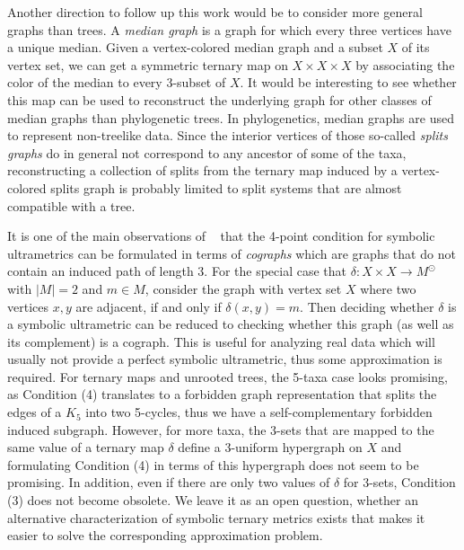 \documentclass{article}
\begin{document}
Another direction to follow up this work would be to consider more general graphs than  
trees. A {\em median graph} is a graph for which every three vertices have a unique median. 
Given a vertex-colored median graph and a subset $X$ of its vertex set, we can get 
a symmetric ternary map on $X \times X \times X$ by associating the color of the median 
to every 3-subset of $X$. It would be interesting to see whether this map can be used 
to reconstruct the underlying graph for other classes of median graphs than 
phylogenetic trees. In phylogenetics, median graphs are used to represent non-treelike 
data. Since the interior vertices of those so-called  {\em splits graphs} 
do in general not correspond to 
any ancestor of some of the taxa, reconstructing a collection of splits from the ternary 
map induced by a vertex-colored splits graph is probably limited to split systems 
that are almost compatible with a tree. 

It is one of the main observations of ~\cite{Hellmuth2013} that the 4-point condition 
for symbolic ultrametrics can be formulated in terms of {\em cographs} which 
are graphs that do 
not contain an induced path of length 3. For the special case that 
$\delta: X\times X\to M^{\odot}$ with $|M|=2$ and $m \in M$, consider the graph with 
vertex set $X$ where two vertices $x,y$ are adjacent, if and only if $\delta(x,y)=m$. 
Then deciding whether $\delta$ is a symbolic 
ultrametric can be reduced to checking whether this graph (as well as its complement) 
is a cograph. This is useful for analyzing real data which will usually not provide a perfect 
symbolic ultrametric, thus some approximation is required. For ternary maps and 
unrooted trees, the 5-taxa case looks promising, as Condition (4) translates to 
a forbidden graph representation that splits the edges of a $K_5$ into two 
5-cycles, thus we have a self-complementary forbidden induced subgraph. 
However, for more taxa, the 3-sets that are mapped to the same value of a ternary map 
$\delta$ define a 3-uniform hypergraph on $X$ and formulating Condition (4) in 
terms of this hypergraph does not seem to be promising. In addition, even if there 
are only two values of $\delta$ for 3-sets, Condition (3) does not become obsolete. 
We leave it as an open question, whether an alternative characterization of 
symbolic ternary metrics exists that makes it easier to solve the corresponding
approximation problem. 
\end{document}
